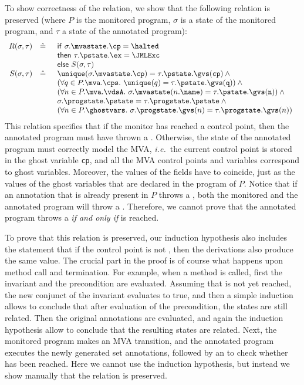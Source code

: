 To show correctness of the relation, we show that the following
relation is preserved (where \(P\) is the monitored program,
\(\sigma\) is a state of the monitored program, and \(\tau\) a state
of the annotated program):
\[
\begin{array}{rcl}
R(\sigma, \tau) & \hat=  &
\begin{array}[t]{l}
\mathsf{if\ }\sigma.\mvastate.\cp = \halted\\
\mathsf{then\ }\tau.\pstate.\ex = \JMLExc\\
\mathsf{else\ }S(\sigma, \tau)
\end{array}\\
S(\sigma, \tau) & \hat= &
\begin{array}[t]{l}
\unique(\sigma.\mvastate.\cp) = \tau.\pstate.\gvs(\texttt{cp}) \:\wedge\\
(\forall q \in P.\mva.\cps.\ \unique(q) =
\tau.\pstate.\gvs(\texttt{q})) \:\wedge\\
(\forall n \in P.\mva.\vdsA.\ \sigma.\mvastate(n.\name) =
                             \tau.\pstate.\gvs(\texttt{n})) \:\wedge\\
\sigma.\progstate.\pstate = \tau.\progstate.\pstate \:\wedge\\
(\forall n \in P.\ghostvars.\ \sigma.\progstate.\gvs(n) =
\tau.\progstate.\gvs(n))
\end{array}
\end{array}
\]
This relation specifies that if the monitor has reached a \halted
control point, then the annotated program must have thrown a
\JMLExc. Otherwise, the state of the annotated program must correctly
model the MVA, \emph{i.e.}\ the current control point is stored in the
ghost variable \texttt{cp}, and all the MVA control points and
variables correspond to ghost variables. Moreover, the values of the
fields have to coincide, just as the values of the ghost variables
that are declared in the program of \(P\). Notice that if an
annotation that is already present in \(P\) throws a \JMLExc,
both the monitored and the annotated program will throw a \JMLExc.
Therefore, we cannot prove that the annotated program throws
a \JMLExc \emph{if and only if} \halted is reached.

To prove that this relation is preserved, our induction hypothesis
also includes the statement that if the control point is not \halted,
then the derivations also produce the same value. The crucial part in
the proof is of course what happens upon method call and
termination. For example, when a method is called, first the invariant and
the precondition are evaluated. Assuming that \halted is not yet reached,
the new conjunct of the invariant evaluates to true, and then a simple
induction allows to conclude that after evaluation of the
precondition, the states are still related. Then the original \preset
annotations are evaluated, and again the induction hypothesis allow to
conclude that the resulting states are related. Next, the monitored
program makes an MVA transition, and the annotated program executes
the newly generated set annotations, followed by an \Assert to check
whether \halted has been reached. Here we cannot use the induction
hypothesis, but instead we show manually that the relation is preserved.

